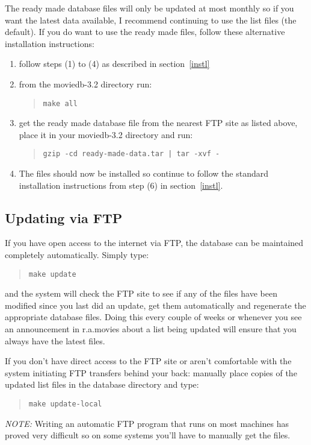 The ready made database files will only be updated at most monthly so if 
you 
want the latest data available, I recommend continuing to use the list 
files 
(the default). If you do want to use the ready made files, follow these 
alternative installation instructions:
\begin{enumerate}
\item follow steps (1) to (4) as described in section~\ref{instl}
\item from the moviedb-3.2 directory run:
\begin{quote}
{\tt make all}
\end{quote}
\item get the ready made database file from the nearest FTP site as listed 
above, place it in your moviedb-3.2 directory and run:
\begin{quote}
{\tt gzip -cd ready-made-data.tar | tar -xvf -}
\end{quote}
\item The files should now be installed so continue to follow the standard
      installation instructions from step (6) in section~\ref{instl}.
\end{enumerate}

\subsection{\label{mntFTP}Updating via FTP}

If you have open access to the internet via FTP, the database can be 
maintained
completely automatically. Simply type:
\begin{quote}
{\tt make update}
\end{quote}
and the system will check the FTP site to see if any of the files have been
modified since you last did an update, get them automatically and 
regenerate
the appropriate database files. Doing this every couple of weeks or 
whenever
you see an announcement in r.a.movies about a list being updated will 
ensure
that you always have the latest files.

If you don't have direct access to the FTP site or aren't comfortable with
the system initiating FTP transfers behind your back: manually place copies
of the updated list files in the database directory and type:
\begin{quote}
{\tt make update-local}
\end{quote}

{\em NOTE:\/} Writing an automatic FTP program that runs on most machines 
has 
proved very difficult so on some systems you'll have to manually get the 
files.  

